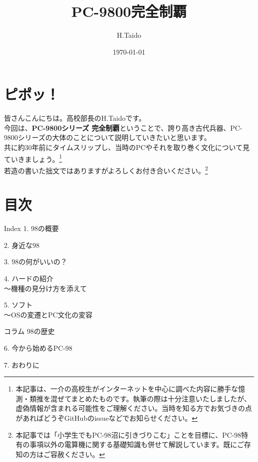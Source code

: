 \documentclass[b5paper,9pt,platex,dvipdfmx]{jsarticle}
\begin{document}
\title{PC-9800完全制覇}
\author{H.Taido}
\date{\today}
\maketitle
\thispagestyle{empty}

\begin{multicols}{3}

\section*{ピポッ！}
皆さんこんにちは。高校部長のH.Taidoです。\\
今回は、{\bf PC-9800シリーズ 完全制覇}ということで、誇り高き古代兵器、PC-9800シリーズの大体のことについて説明していきたいと思います。\\共に約30年前にタイムスリップし、当時のPCやそれを取り巻く文化について見ていきましょう。\footnote{本記事は、一介の高校生がインターネットを中心に調べた内容に勝手な憶測・類推を混ぜてまとめたものです。執筆の際は十分注意いたしましたが、虚偽情報が含まれる可能性をご理解ください。当時を知る方でお気づきの点があればどうぞGitHubのissueなどでお知らせください。}\\
若造の書いた拙文ではありますがよろしくお付き合いください。\footnote{本記事では「小学生でもPC-98沼に引きづりこむ」ことを目標に、PC-98特有の事項以外の電算機に関する基礎知識も併せて解説しています。既にご存知の方はご容赦ください。}
\section*{目次}
\begin{itembox}[l]{Index}
  1. 98の概要

  2. 身近な98

  3. 98の何がいいの？

  4. ハードの紹介
  \\〜機種の見分け方を添えて

  5. ソフト
  \\〜OSの変遷とPC文化の変容

  コラム 98の歴史

  6. 今から始めるPC-98

  7. おわりに


\end{itembox}
\end{multicols}
\end{document}
